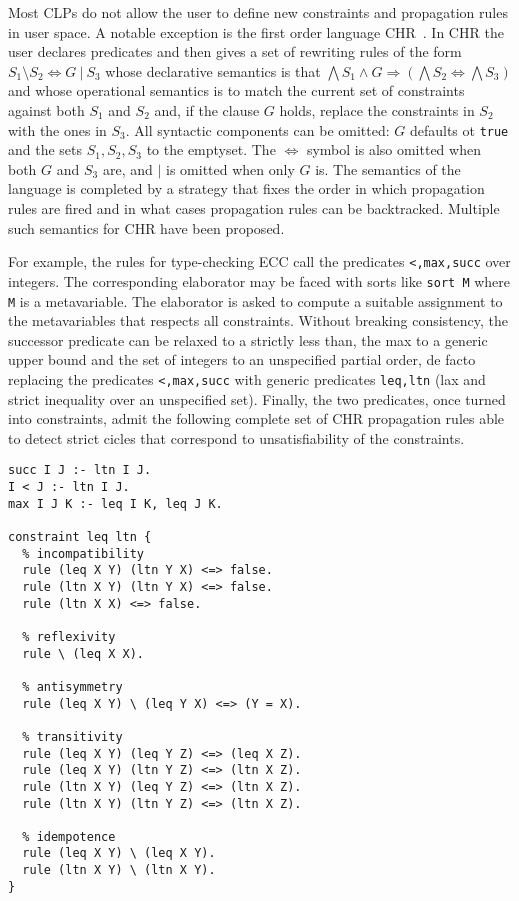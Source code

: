\documentclass{easychair}
\begin{document}
Most CLPs do not allow the user to define new constraints and propagation rules in user space. A notable exception is the first order language CHR~\cite{chr}. In CHR the user declares predicates and then gives a set of rewriting rules of the form $S_1 \setminus S_2 \iff G~|~S_3$ whose declarative semantics is that
$\bigwedge S_1 \wedge G \Rightarrow (\bigwedge S_2 \iff \bigwedge S_3)$ and whose operational semantics is to match the current set of constraints against both $S_1$ and $S_2$ and, if the clause $G$ holds, replace the constraints in $S_2$ with the ones in $S_3$. All syntactic components can be omitted: $G$ defaults ot \verb+true+ and the sets $S_1,S_2,S_3$ to the emptyset. The $\iff$ symbol is also omitted when both $G$ and $S_3$ are, and $|$ is omitted when only $G$ is. The semantics of the language is completed by a strategy that fixes the order in which propagation rules are fired and in what cases propagation rules can be backtracked. Multiple such semantics for CHR have been proposed.

For example, the rules for type-checking ECC call the predicates \verb+<,max,succ+ over integers. The corresponding elaborator may be faced with sorts like \verb+sort M+ where \verb+M+ is a metavariable. The elaborator is asked to compute a suitable assignment to the metavariables that respects all constraints. Without breaking consistency, the successor predicate can be relaxed to a strictly less than, the max to a generic upper bound and the set of integers to an unspecified partial order, de facto replacing the predicates \verb+<,max,succ+ with generic predicates \verb+leq,ltn+ (lax and strict inequality over an unspecified set). Finally, the two predicates, once turned into constraints, admit the following complete set of CHR propagation rules able to detect strict cicles that correspond to unsatisfiability of the constraints.

\begin{verbatim}
succ I J :- ltn I J.
I < J :- ltn I J.
max I J K :- leq I K, leq J K.

constraint leq ltn {
  % incompatibility
  rule (leq X Y) (ltn Y X) <=> false.
  rule (ltn X Y) (ltn Y X) <=> false.
  rule (ltn X X) <=> false.
  
  % reflexivity
  rule \ (leq X X).

  % antisymmetry
  rule (leq X Y) \ (leq Y X) <=> (Y = X).

  % transitivity
  rule (leq X Y) (leq Y Z) <=> (leq X Z).
  rule (leq X Y) (ltn Y Z) <=> (ltn X Z).
  rule (ltn X Y) (leq Y Z) <=> (ltn X Z).
  rule (ltn X Y) (ltn Y Z) <=> (ltn X Z).

  % idempotence
  rule (leq X Y) \ (leq X Y).
  rule (ltn X Y) \ (ltn X Y).
}
\end{verbatim}
\end{document}
